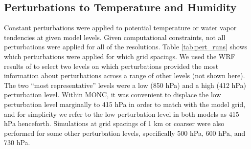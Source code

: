 \documentclass[draft]{agujournal2019}
\begin{document}
\subsection{Perturbations to Temperature and Humidity}

Constant perturbations were applied to potential temperature or water vapor
tendencies at given model levels. Given computational constraints, not all
perturbations were applied for all of the resolutions.  Table \ref{tab:pert_runs} 
shows which perturbations were applied for which grid spacings. We used the WRF
results of  to select two levels on which perturbations
provided the most information about perturbations across a range of other levels (not shown
here). The two ``most representative'' levels were a low (850 hPa) and a high
(412 hPa) perturbation level. Within MONC, it was convenient to displace the low 
perturbation level marginally to 415 hPa in order to match with the model grid, and for 
simplicity we refer to the low perturbation level in both models as 415 hPa henceforth.  
Simulations at grid spacings of 1 km or coarser were also performed for some other 
perturbation levels, specifically 500 hPa, 600 hPa, and 730 hPa.
\end{document}
